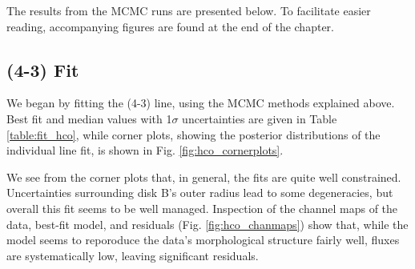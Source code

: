 The results from the MCMC runs are presented below. To facilitate easier reading, accompanying figures are found at the end of the chapter.




\subsection{\hco (4-3) Fit}
\label{subsection:hco_fit}

We began by fitting the \hco(4-3) line, using the MCMC methods explained above. Best fit and median values with 1$\sigma$  uncertainties are given in Table \ref{table:fit_hco}, while corner plots, showing the posterior distributions of the individual line fit, is shown in Fig. \ref{fig:hco_cornerplots}.


We see from the corner plots that, in general, the fits are quite well constrained. Uncertainties surrounding disk B's outer radius lead to some degeneracies, but overall this fit seems to be well managed. Inspection of the channel maps of the \hco data, best-fit model, and residuals (Fig. \ref{fig:hco_chanmaps}) show that, while the model seems to reporoduce the data's morphological structure fairly well, fluxes are systematically low, leaving significant residuals.


